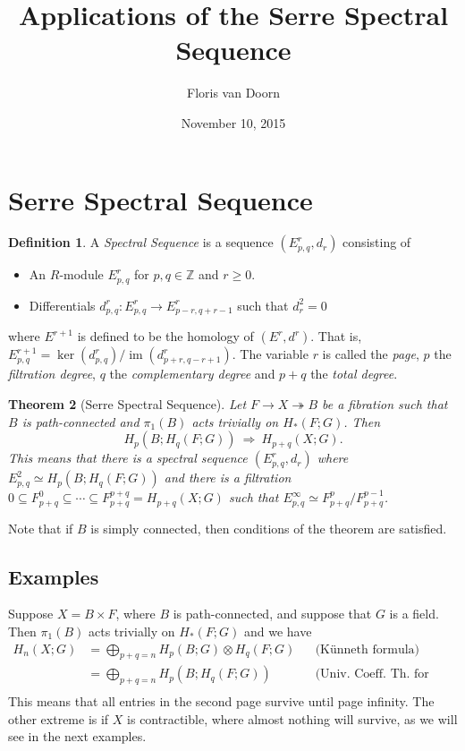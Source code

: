 \documentclass{article}
\newcommand{\mb}[1]{\mathbb{#1}}
\newcommand{\Z}{\mb{Z}}
\DeclareMathOperator{\myker}{ker}
\DeclareMathOperator{\im}{im}
\newtheorem{theorem}{Theorem}[section]
\theoremstyle{definition}
\newtheorem{definition}[theorem]{Definition}
\newenvironment{example}
  {\pushQED{\qed}\renewcommand{\qedsymbol}{$\triangle$}\examplex}
  {\popQED\endexamplex}
\theoremstyle{remark}
\begin{document}
\title{Applications of the Serre Spectral Sequence}
\author{Floris van Doorn}
\date{November 10, 2015}
\maketitle

\section{Serre Spectral Sequence}

\begin{definition}
A \emph{Spectral Sequence} is a sequence $(E_{p,q}^r,d_r)$ consisting of
\begin{itemize}
\item An $R$-module $E^r_{p,q}$ for $p,q\in \Z$ and $r\geq 0$.
\item Differentials $d_{p,q}^r : E_{p,q}^r\to E_{p-r,q+r-1}^r$ such that $d_r^2=0$
\end{itemize}
where $E^{r+1}$ is defined to be the homology of $(E^r,d^r)$. That is,
$E_{p,q}^{r+1}=\myker(d_{p,q}^r)/\im(d_{p+r,q-r+1}^r)$. The variable $r$ is called the \emph{page}, $p$ the \emph{filtration degree}, $q$ the \emph{complementary degree} and $p+q$ the \emph{total degree}.
\end{definition}

\begin{theorem}[Serre Spectral Sequence]
Let $F \to X \twoheadrightarrow B$ be a fibration such that $B$ is path-connected and $\pi_1(B)$
acts trivially on $H_*(F;G)$. Then
$$H_p(B;H_q(F;G))\ \Longrightarrow\ H_{p+q}(X;G).$$ This means that there is a spectral sequence
$(E_{p,q}^r,d_r)$ where $E_{p,q}^2\simeq H_p(B;H_q(F;G))$ and there is a filtration $0 \subseteq
F_{p+q}^0 \subseteq \cdots \subseteq F_{p+q}^{p+q}=H_{p+q}(X;G)$ such that $E_{p,q}^\infty\simeq
F_{p+q}^p/F_{p+q}^{p-1}$.
\end{theorem}

Note that if $B$ is simply connected, then conditions of the theorem are satisfied.


\subsection{Examples}

\begin{example}
Suppose $X=B\times F$, where $B$ is path-connected, and suppose that $G$ is a field. Then $\pi_1(B)$
acts trivially on $H_*(F;G)$ and we have
\begin{align*}
H_n(X;G) &= \bigoplus_{p+q=n}H_p(B;G)\otimes H_q(F;G)&&\text{(K\"unneth formula)}\\
&=\bigoplus_{p+q=n}H_p(B;H_q(F;G))&&\text{(Univ. Coeff. Th. for homology)}\\
\end{align*}
This means that all entries in the second page survive until page infinity. The other extreme is if
$X$ is contractible, where almost nothing will survive, as we will see in the next examples.
\end{example}
\end{document}
